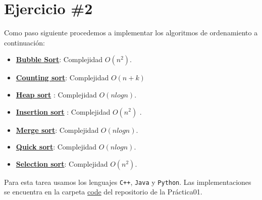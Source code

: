 \section*{Ejercicio \#2}
Como paso siguiente procedemos a implementar los algoritmos de ordenamiento a continuación:
\begin{itemize}
    \item \href{https://github.com/syordya/CSUNSA-EDA/tree/master/Practica01/code/BubbleSort}{\textbf{Bubble Sort}}: Complejidad $O(n^2)$.
    \item \href{https://github.com/syordya/CSUNSA-EDA/tree/master/Practica01/code/CountingSort}{\textbf{Counting sort}}: Complejidad $O(n+k)$
    \item \href{https://github.com/syordya/CSUNSA-EDA/tree/master/Practica01/code/HeapSort}{\textbf{Heap sort}} : Complejidad $O(nlogn)$.
    \item \href{https://github.com/syordya/CSUNSA-EDA/tree/master/Practica01/code/InsertionSort}{\textbf{Insertion sort}} : Complejidad $O(n^2)$ \cite{cormen}.
    \item \href{https://github.com/syordya/CSUNSA-EDA/tree/master/Practica01/code/MergeSort}{\textbf{Merge sort}}: Complejidad $O(n log n)$.
    \item \href{https://github.com/syordya/CSUNSA-EDA/tree/master/Practica01/code/QuickSort}{\textbf{Quick sort}}: Complejidad $O(nlogn)$.
    \item \href{https://github.com/syordya/CSUNSA-EDA/tree/master/Practica01/code/SelectionSort}{\textbf{Selection sort}}: Complejidad $O(n^2)$.
\end{itemize}

Para esta tarea usamos los lenguajes \verb!C++!, \verb!Java! y \verb!Python!. Las implementaciones se encuentra en la carpeta \href{https://github.com/syordya/CSUNSA-EDA/tree/master/Practica01/code}{code} del repositorio de la Práctica01.

\iffalse
Como se muestra en la figuras \ref{fig:act-1_a} y \ref{fig:act-1_b}.
\begin{figure}[H]
\centering
\begin{minipage}{0.45\textwidth}
  \centering
  \texttt{[image: act-1\_a]}
  \caption{Envío de \textit{ICMP ECHO REQUEST} de PC0 a PC1, PC2 y PC3.}
  \label{fig:act-1_a}
\end{minipage}\hfill
\begin{minipage}{0.45\textwidth}
  \centering
  \texttt{[image: act-1\_b]}
  \caption{Respuesta de PC1, PC2 y PC3. Tabla ARP de PC0.}
  \label{fig:act-1_b}
\end{minipage}
\end{figure}
Como se muestra en la figura \ref{fig:act-3}
\begin{figure}[H]
  \centering
  \texttt{[image: act-3]}
  \caption{Tabla de subneteo para la red 192.168.100.0.}
  \label{fig:act-3}
\end{figure}
\fi
